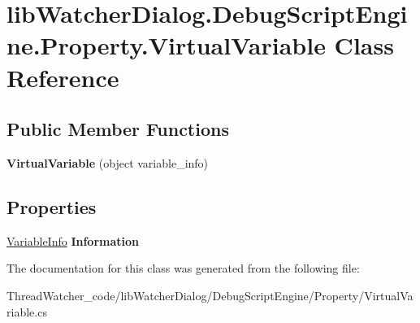 \hypertarget{classlib_watcher_dialog_1_1_debug_script_engine_1_1_property_1_1_virtual_variable}{\section{lib\+Watcher\+Dialog.\+Debug\+Script\+Engine.\+Property.\+Virtual\+Variable Class Reference}
\label{classlib_watcher_dialog_1_1_debug_script_engine_1_1_property_1_1_virtual_variable}
}
\subsection*{Public Member Functions}
\begin{DoxyCompactItemize}
\item 
\hypertarget{classlib_watcher_dialog_1_1_debug_script_engine_1_1_property_1_1_virtual_variable_a5bfb93c61204bc4c22d1fc1882098699}{{\bfseries Virtual\+Variable} (object variable\+\_\+info)}\label{classlib_watcher_dialog_1_1_debug_script_engine_1_1_property_1_1_virtual_variable_a5bfb93c61204bc4c22d1fc1882098699}

\end{DoxyCompactItemize}
\subsection*{Properties}
\begin{DoxyCompactItemize}
\item 
\hypertarget{classlib_watcher_dialog_1_1_debug_script_engine_1_1_property_1_1_virtual_variable_a9947b1596df1373de6568e7c9cccdbcf}{\hyperlink{classlib_watcher_dialog_1_1_debug_script_engine_1_1_property_1_1_variable_info}{Variable\+Info} {\bfseries Information}}\label{classlib_watcher_dialog_1_1_debug_script_engine_1_1_property_1_1_virtual_variable_a9947b1596df1373de6568e7c9cccdbcf}

\end{DoxyCompactItemize}


The documentation for this class was generated from the following file\+:\begin{DoxyCompactItemize}
\item 
Thread\+Watcher\+\_\+code/lib\+Watcher\+Dialog/\+Debug\+Script\+Engine/\+Property/Virtual\+Variable.\+cs\end{DoxyCompactItemize}
